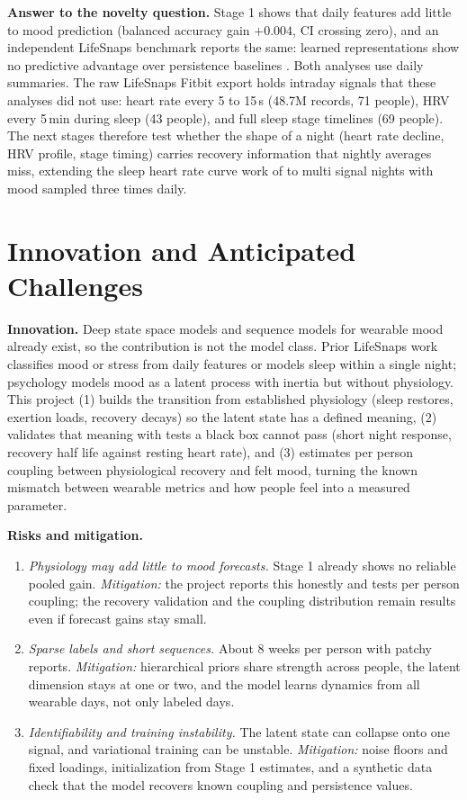 \documentclass[11pt]{article}
\begin{document}
\textbf{Answer to the novelty question.} Stage 1 shows that daily features add little to mood prediction (balanced accuracy gain $+0.004$, CI crossing zero), and an independent LifeSnaps benchmark reports the same: learned representations show no predictive advantage over persistence baselines \cite{gavai}. Both analyses use daily summaries. The raw LifeSnaps Fitbit export holds intraday signals that these analyses did not use: heart rate every 5 to 15\,s (48.7M records, 71 people), HRV every 5\,min during sleep (43 people), and full sleep stage timelines (69 people). The next stages therefore test whether the shape of a night (heart rate decline, HRV profile, stage timing) carries recovery information that nightly averages miss, extending the sleep heart rate curve work of \cite{fudolig} to multi signal nights with mood sampled three times daily.

\section{Innovation and Anticipated Challenges}
\textbf{Innovation.} Deep state space models and sequence models for wearable mood already exist, so the contribution is not the model class. Prior LifeSnaps work classifies mood or stress from daily features or models sleep within a single night; psychology models mood as a latent process with inertia but without physiology. This project (1) builds the transition from established physiology (sleep restores, exertion loads, recovery decays) so the latent state has a defined meaning, (2) validates that meaning with tests a black box cannot pass (short night response, recovery half life against resting heart rate), and (3) estimates per person coupling between physiological recovery and felt mood, turning the known mismatch between wearable metrics and how people feel into a measured parameter.

\textbf{Risks and mitigation.}
\begin{enumerate}
\item \emph{Physiology may add little to mood forecasts.} Stage 1 already shows no reliable pooled gain. \emph{Mitigation:} the project reports this honestly and tests per person coupling; the recovery validation and the coupling distribution remain results even if forecast gains stay small.
\item \emph{Sparse labels and short sequences.} About 8 weeks per person with patchy reports. \emph{Mitigation:} hierarchical priors share strength across people, the latent dimension stays at one or two, and the model learns dynamics from all wearable days, not only labeled days.
\item \emph{Identifiability and training instability.} The latent state can collapse onto one signal, and variational training can be unstable. \emph{Mitigation:} noise floors and fixed loadings, initialization from Stage 1 estimates, and a synthetic data check that the model recovers known coupling and persistence values.
\end{enumerate}
\end{document}
